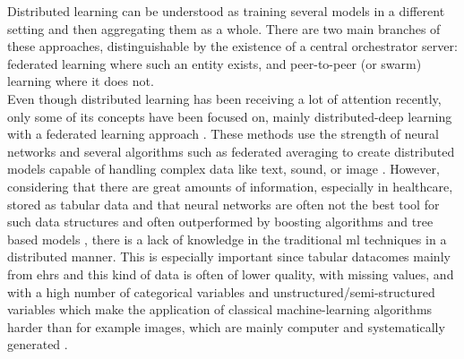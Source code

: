 
Distributed learning \cite{distributed} can be understood as training several models in a different setting and then aggregating them as a whole. There are two main branches of these approaches, distinguishable by the existence of a central orchestrator server: federated learning where such an entity exists, and peer-to-peer (or swarm) \cite{swarm_learning} learning where it does not. \\
Even though distributed learning has been receiving a lot of attention recently, only some of its concepts have been focused on, mainly distributed-deep learning with a federated learning approach \cite{xuFederatedLearningHealthcare2021,leeFederatedLearningClinical2020}. These methods use the strength of neural networks and several algorithms such as federated averaging to create distributed models capable of handling complex data like text, sound, or image \cite{prayitnoSystematicReviewFederated2021}. However, considering that there are great amounts of information, especially in healthcare, stored as tabular data \cite{alvarezsanchezTAQIHToolTabular2019,dimartinoExplainableAIClinical2022,payrovnaziriExplainableArtificialIntelligence2020,mcelfreshWhenNeuralNets2023,klambauerSelfNormalizingNeuralNetworks2017} and that neural networks are often not the best tool for such data structures and often outperformed by boosting algorithms and tree based models \cite{borisovDeepNeuralNetworks2022a,grinsztajnWhyTreebasedModels2022a}, there is a lack of knowledge in the traditional \ac{ml} techniques in a distributed manner. This is especially important since tabular datacomes mainly from \acp{ehr} and this kind of data is often of lower quality, with missing values, and with a high number of categorical variables and unstructured/semi-structured variables which make the application of classical machine-learning algorithms harder than for example images, which are mainly computer and systematically generated \cite{peekThreeControversiesHealth2018}.

